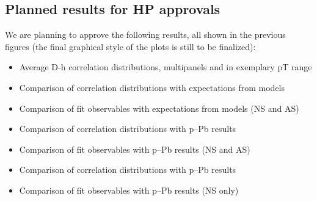 \clearpage

%

%

%

\subsection{Planned results for HP approvals}
We are planning to approve the following results, all shown in the previous figures (the final graphical style of the plots is still to be finalized):
\begin{itemize}
\item Average D-h correlation distributions, multipanels and in exemplary pT range
\item Comparison of correlation distributions with expectations from models
\item Comparison of fit observables with expectations from models (NS and AS)
\item Comparison of correlation distributions with p--Pb results
\item Comparison of fit observables with p--Pb results (NS and AS)
\item Comparison of correlation distributions with p--Pb results
\item Comparison of fit observables with p--Pb results (NS only)
\end{itemize}

\clearpage
